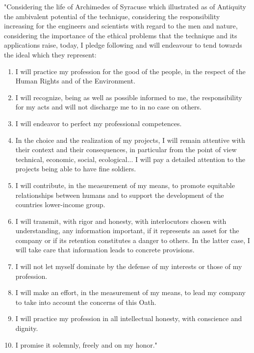 	"Considering the life of Archimedes of Syracuse which illustrated as of Antiquity the ambivalent potential of the technique, considering the responsibility increasing for the engineers and scientists with regard to the men and nature, considering the importance of the ethical problems that the technique and its applications raise, today, I pledge following and will endeavour to tend towards the ideal which they represent:
	\begin{enumerate}
		\item I will practice my profession for the good of the people, in the respect of the Human Rights and of the Environment.

		\item I will recognize, being as well as possible informed to me, the responsibility for my acts and will not discharge me to in no case on others.

		\item I will endeavor to perfect my professional competences.

		\item In the choice and the realization of my projects, I will remain attentive with their context and their consequences, in particular from the point of view technical, economic, social, ecological... I will pay a detailed attention to the projects being able to have fine soldiers.

		\item I will contribute, in the measurement of my means, to promote equitable relationships between humans and to support the development of the countries lower-income group.

		\item I will transmit, with rigor and honesty, with interlocutors chosen with understanding, any information important, if it represents an asset for the company or if its retention constitutes a danger to others. In the latter case, I will take care that information leads to concrete provisions.

		\item I will not let myself dominate by the defense of my interests or those of my profession.

		\item I will make an effort, in the measurement of my means, to lead my company to take into account the concerns of this Oath.

		\item I will practice my profession in all intellectual honesty, with conscience and dignity.

		\item I promise it solemnly, freely and on my honor."
\end{enumerate}
